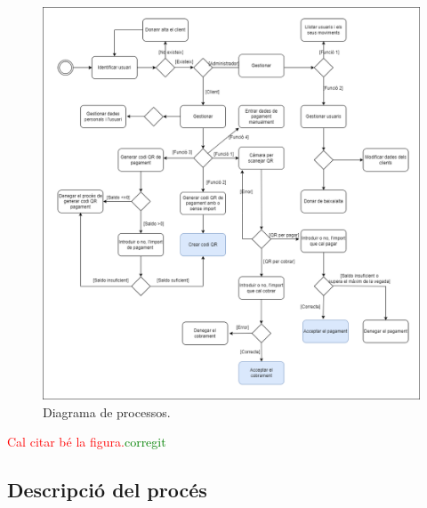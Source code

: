 \documentclass[a4paper,12pt,twoside]{ThesisStyle}
\newcommand{\pau}[1]{\textcolor{red}{#1}}
\newcommand{\sudan}[1]{\textcolor{green}{#1}}
\begin{document}
\begin{figure}[h]
    \centering
    \includegraphics[width=1\textwidth]{imatges/diagrama processos.png}
    \caption{Diagrama de processos.}
    \label{fig: Diagrama de processos}
\end{figure}

\pau{Cal citar bé la figura.}\sudan{corregit}




\subsection{Descripció del procés}
\label{subsec:Descripció del procés}
\end{document}
